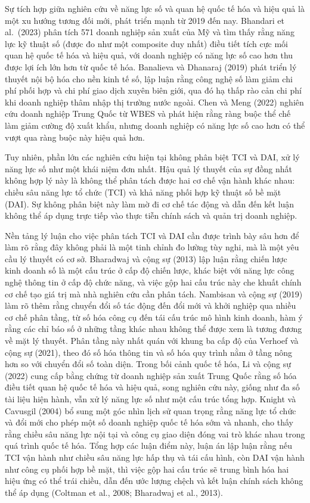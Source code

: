\documentclass[
  a4paper,
  13pt]{extreport}
\begin{document}
Sự tích hợp giữa nghiên cứu về năng lực số và quan hệ quốc tế hóa và
hiệu quả là một xu hướng tương đối mới, phát triển mạnh từ 2019 đến nay.
Bhandari et al.~(2023) phân tích 571 doanh nghiệp sản xuất của Mỹ và tìm
thấy rằng năng lực kỹ thuật số (được đo như một composite duy nhất) điều
tiết tích cực mối quan hệ quốc tế hóa và hiệu quả, với doanh nghiệp có
năng lực số cao hơn thu được lợi ích lớn hơn từ quốc tế hóa. Banalieva
và Dhanaraj (2019) phát triển lý thuyết nội bộ hóa cho nền kinh tế số,
lập luận rằng công nghệ số làm giảm chi phí phối hợp và chi phí giao
dịch xuyên biên giới, qua đó hạ thấp rào cản chi phí khi doanh nghiệp
thâm nhập thị trường nước ngoài. Chen và Meng (2022) nghiên cứu doanh
nghiệp Trung Quốc từ WBES và phát hiện rằng ràng buộc thể chế làm giảm
cường độ xuất khẩu, nhưng doanh nghiệp có năng lực số cao hơn có thể
vượt qua ràng buộc này hiệu quả hơn.

Tuy nhiên, phần lớn các nghiên cứu hiện tại không phân biệt TCI và DAI,
xử lý năng lực số như một khái niệm đơn nhất. Hậu quả lý thuyết của sự
đồng nhất không hợp lý này là không thể phân tách được hai cơ chế vận
hành khác nhau: chiều sâu năng lực tổ chức (TCI) và khả năng phối hợp kỹ
thuật số bề mặt (DAI). Sự không phân biệt này làm mờ đi cơ chế tác động
và dẫn đến kết luận không thể áp dụng trực tiếp vào thực tiễn chính sách
và quản trị doanh nghiệp.

Nền tảng lý luận cho việc phân tách TCI và DAI cần được trình bày sâu
hơn để làm rõ rằng đây không phải là một tinh chỉnh đo lường tùy nghi,
mà là một yêu cầu lý thuyết có cơ sở. Bharadwaj và cộng sự (2013) lập
luận rằng chiến lược kinh doanh số là một cấu trúc ở cấp độ chiến lược,
khác biệt với năng lực công nghệ thông tin ở cấp độ chức năng, và việc
gộp hai cấu trúc này che khuất chính cơ chế tạo giá trị mà nhà nghiên
cứu cần phân tách. Nambisan và cộng sự (2019) làm rõ thêm rằng chuyển
đổi số tác động đến đổi mới và khởi nghiệp qua nhiều cơ chế phân tầng,
từ số hóa công cụ đến tái cấu trúc mô hình kinh doanh, hàm ý rằng các
chỉ báo số ở những tầng khác nhau không thể được xem là tương đương về
mặt lý thuyết. Phân tầng này nhất quán với khung ba cấp độ của Verhoef
và cộng sự (2021), theo đó số hóa thông tin và số hóa quy trình nằm ở
tầng nông hơn so với chuyển đổi số toàn diện. Trong bối cảnh quốc tế
hóa, Li và cộng sự (2022) cung cấp bằng chứng từ doanh nghiệp sản xuất
Trung Quốc rằng số hóa điều tiết quan hệ quốc tế hóa và hiệu quả, song
nghiên cứu này, giống như đa số tài liệu hiện hành, vẫn xử lý năng lực
số như một cấu trúc tổng hợp. Knight và Cavusgil (2004) bổ sung một góc
nhìn lịch sử quan trọng rằng năng lực tổ chức và đổi mới cho phép một số
doanh nghiệp quốc tế hóa sớm và nhanh, cho thấy rằng chiều sâu năng lực
nội tại và công cụ giao diện đóng vai trò khác nhau trong quá trình quốc
tế hóa. Tổng hợp các luận điểm này, luận án lập luận rằng nếu TCI vận
hành như chiều sâu năng lực hấp thụ và tái cấu hình, còn DAI vận hành
như công cụ phối hợp bề mặt, thì việc gộp hai cấu trúc sẽ trung bình hóa
hai hiệu ứng có thể trái chiều, dẫn đến ước lượng chệch và kết luận
chính sách không thể áp dụng (Coltman et al., 2008; Bharadwaj et al.,
2013).
\end{document}
